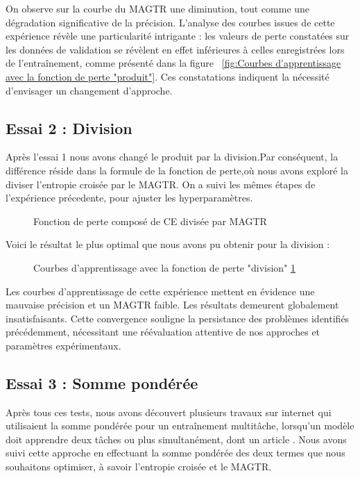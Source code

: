 \documentclass{report}
\begin{document}
{\hspace{1.6cm}On observe sur la courbe du MAGTR une diminution, tout comme une dégradation significative de la précision. L'analyse des courbes issues de cette expérience révèle une particularité intrigante : les valeurs de perte constatées sur les données de validation se révèlent en effet inférieures à celles enregistrées lors de l'entraînement, comme présenté dans la figure ~\ref{fig:Courbes d'apprentissage avec la fonction de perte "produit"}. Ces constatations indiquent la nécessité d'envisager un changement d'approche.

\newpage
\subsection{Essai 2 : Division}
\hspace{1.6cm}Après l'essai 1 nous avons changé le produit par la division.Par conséquent, la différence réside dans la formule de la fonction de perte,où nous avons exploré la diviser l'entropie croisée par le MAGTR. On a suivi les mêmes étapes de l'expérience précedente, pour ajuster les hyperparamètres. 

\begin{figure}[htbp] 
	\centering
	\caption{Fonction de perte composé de CE divisée par MAGTR}
	\label{fig:Fonction de perte composé de CE divisée par MAGTR}
\end{figure}

Voici le résultat le plus optimal que nous avons pu obtenir pour la division :
\begin{figure}[htbp] 
	\centering
	\caption{Courbes d'apprentissage avec la fonction de perte "division" \ref{fig:Fonction de perte composé de CE divisée par MAGTR}}
	\label{fig:Courbes d'apprentissage de l'expérience division}
\end{figure}

\hspace{1.6cm}Les courbes d'apprentissage de cette expérience mettent en évidence une mauvaise précision et un MAGTR faible. Les résultats demeurent globalement insatisfaisants. Cette convergence souligne la persistance des problèmes identifiés précédemment, nécessitant une réévaluation attentive de nos approches et paramètres expérimentaux.


\subsection{Essai 3 : Somme pondérée }
\hspace{1.6cm}Après tous ces tests, nous avons découvert plusieurs travaux sur internet qui utilisaient la somme pondérée pour un entraînement multitâche, lorsqu'un modèle doit apprendre deux tâches ou plus simultanément, dont un article \cite{Kendall_2018_CVPR}. Nous avons suivi cette approche en effectuant la somme pondérée des deux termes que nous souhaitons optimiser, à savoir l'entropie croisée et le MAGTR.  

}
\end{document}
